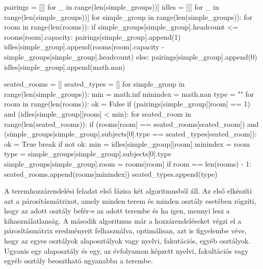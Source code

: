 \documentclass[a4paper,12pt]{article}
\begin{document}
\begin{python}
pairings = [[] for _ in range(len(simple_groups))]
idles = [[] for _ in range(len(simple_groups))]
for simple_group in range(len(simple_groups)):
    for room in range(len(rooms)):
        if simple_groups[simple_group].headcount <= rooms[room].capacity:
            pairings[simple_group].append(1)
            idles[simple_group].append(rooms[room].capacity - simple_groups[simple_group].headcount)
        else:
            pairings[simple_group].append(0)
            idles[simple_group].append(math.nan)

seated_rooms = []
seated_types = []
for simple_group in range(len(simple_groups)):
    min = math.inf
    minindex = math.nan
    type = ""
    for room in range(len(rooms)):
        ok = False
        if (pairings[simple_group][room] == 1) and (idles[simple_group][room] < min):
            for seated_room in range(len(seated_rooms)):
                if (rooms[room] == seated_rooms[seated_room]) and (simple_groups[simple_group].subjects[0].type == seated_types[seated_room]):
                    ok = True
                    break
            if not ok:
                min = idles[simple_group][room]
                minindex = room
                type = simple_groups[simple_group].subjects[0].type
                simple_groups[simple_group].room = rooms[room]
        if room == len(rooms) - 1:
            seated_rooms.append(rooms[minindex])
            seated_types.append(type)
\end{python}

A teremhozzárendelési feladat első fázisa két algoritmusból áll. Az első elkészíti azt a párosításmátrixot, amely minden terem és minden osztály esetében rögzíti, hogy az adott osztály befér-e az adott terembe és ha igen, mennyi lesz a kihasználatlanság. A második algoritmus már a hozzárendeléseket végzi el a párosításmátrix eredményeit felhasználva, optimálisan, azt is figyelembe véve, hogy az egyes osztályok alaposztályok vagy nyelvi, fakutációs, egyéb osztályok. Ugyanis egy alaposztály és egy, az évfolyamon képzett nyelvi, fakultációs vagy egyéb osztály beosztható ugyanabba a terembe.
\end{document}
